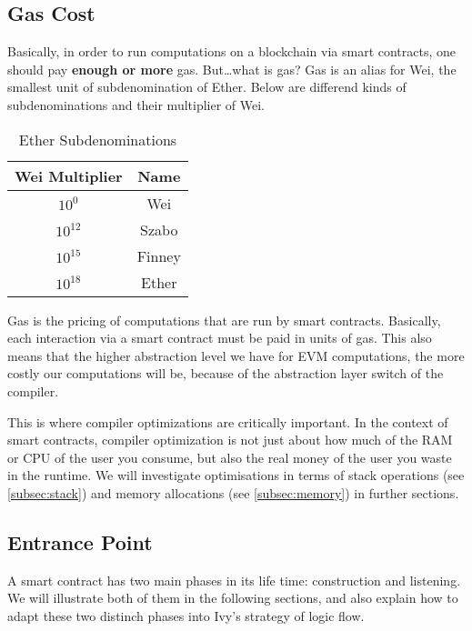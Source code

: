 \documentclass{article}
\begin{document}
\subsection{Gas Cost}
\par Basically, in order to run computations on a blockchain via smart contracts, one should pay \textbf{enough or more} gas. But\ldots what is gas? Gas is an alias for Wei, the smallest unit of subdenomination of Ether. Below are differend kinds of subdenominations and their multiplier of Wei.

\begin{table}[h]
  \centering
  \begin{tabular}{|c|c|}
    \hline
    \textbf{Wei Multiplier} & \textbf{Name} \\
    \hline
    $ 10^0 $ & Wei \\
    \hline
    $ 10^12 $ & Szabo \\
    \hline
    $ 10^15 $ & Finney \\
    \hline
    $ 10^18 $ & Ether \\
    \hline
  \end{tabular}
  \caption{Ether Subdenominations}
  \label{tab:ether_subdenominations}
\end{table}
\par Gas is the pricing of computations that are run by smart contracts. Basically, each interaction via a smart contract must be paid in units of gas. This also means that the higher abstraction level we have for EVM computations, the more costly our computations will be, because of the abstraction layer switch of the compiler.
\par This is where compiler optimizations are critically important. In the context of smart contracts, compiler optimization is not just about how much of the RAM or CPU of the user you consume, but also the real money of the user you waste in the runtime. We will investigate optimisations in terms of stack operations (see \ref{subsec:stack}) and memory allocations (see \ref{subsec:memory}) in further sections.

\subsection{Entrance Point}
\par A smart contract has two main phases in its life time: construction and listening. We will illustrate both of them in the following sections, and also explain how to adapt these two distinch phases into Ivy's strategy of logic flow.
\end{document}
